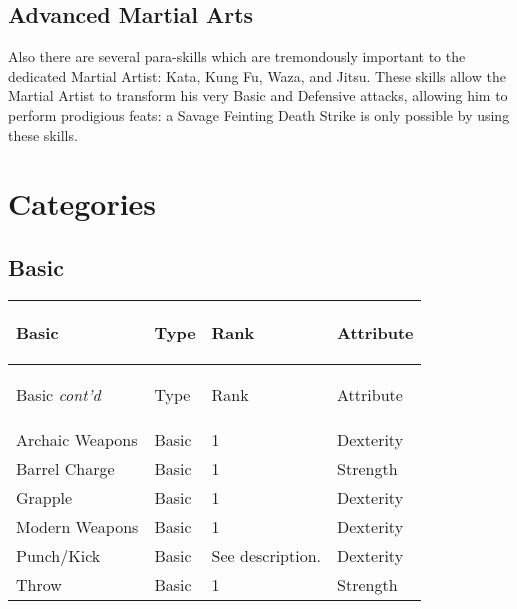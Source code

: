 \documentclass[twoside]{book}
\begin{document}
\subsection{Advanced Martial Arts}
    
    {  
      Also there are several para-skills which are
               tremondously important to the dedicated Martial Artist:
               Kata, Kung Fu, Waza, and Jitsu. These skills allow the
               Martial Artist to transform his very Basic and Defensive
               attacks, allowing him to perform prodigious feats: a
               Savage Feinting Death Strike is only possible by using
               these skills. 
    }
  
    

\section{Categories}
    
    

\subsection{Basic}
    
\begin{longtable}{p{1.25in}lll} 
  Basic& \begin{turn}{70}{Type}\end{turn}
          & \begin{turn}{70}{Rank}\end{turn}
          & \begin{turn}{70}{Attribute}\end{turn}
          \\
  \hline
  \hline
  \endfirsthead
  Basic \textit{cont'd}
        & \begin{turn}{70}{Type}\end{turn}
          & \begin{turn}{70}{Rank}\end{turn}
          & \begin{turn}{70}{Attribute}\end{turn}
           \\
  \hline
  \endhead
\raggedright Archaic Weapons & Basic & 1 & Dexterity \tabularnewline
      \raggedright Barrel Charge & Basic & 1 & Strength \tabularnewline
      \raggedright Grapple & Basic & 1 & Dexterity \tabularnewline
      \raggedright Modern Weapons & Basic & 1 & Dexterity \tabularnewline
      \raggedright Punch/Kick & Basic & See description. & Dexterity \tabularnewline
      \raggedright Throw & Basic & 1 & Strength \tabularnewline
      
\end{longtable}
    
\end{document}
